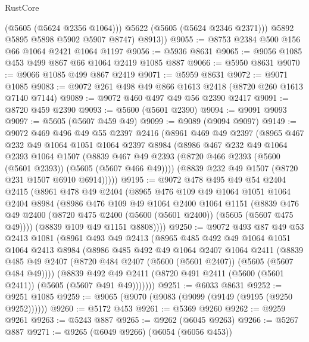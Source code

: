 \begin{lexlean}{RustCore}
\begin{coremodule}
              (@5605 (@5624 @2356 @1064)))
            @5622
            (@5605 (@5624 @2346 @2371)))
          @5892
          @5895
          @5898
          @5902
          @5907
          @8747)
        @8913))
@9055 := @8753 @2384 @500 @156 @66 @1064 @2421 @1064 @1197
@9056 := @5936 @8631
@9065 := @9056 @1085 @453 @499 @867 @66 @1064 @2419 @1085 @887
@9066 := @5950 @8631
@9070 := @9066 @1085 @499 @867 @2419
@9071 := @5959 @8631
@9072 := @9071 @1085
@9083 := @9072 @261 @498 @49 @866 @1613 @2418 (@8720 @260 @1613 @7140 @7144)
@9089 := @9072 @460 @497 @49 @56 @2390 @2417
@9091 := @8720 @459 @2390
@9093 := @5600 (@5601 @2390)
@9094 := @9091 @9093
@9097 := @5605 (@5607 @459 @49)
@9099 := @9089 (@9094 @9097)
@9149 := @9072
    @469
    @496
    @49
    @55
    @2397
    @2416
    (@8961
      @469
      @49
      @2397
      (@8965
        @467
        @232
        @49
        @1064
        @1051
        @1064
        @2397
        @8984
        (@8986
          @467
          @232
          @49
          @1064
          @2393
          @1064
          @1507
          (@8839 @467 @49 @2393 (@8720 @466 @2393 (@5600 (@5601 @2393)) (@5605 (@5607 @466 @49))))
          (@8839 @232 @49 @1507 (@8720 @231 @1507 @6910 @6914)))))
@9195 := @9072
    @478
    @495
    @49
    @54
    @2404
    @2415
    (@8961
      @478
      @49
      @2404
      (@8965
        @476
        @109
        @49
        @1064
        @1051
        @1064
        @2404
        @8984
        (@8986
          @476
          @109
          @49
          @1064
          @2400
          @1064
          @1151
          (@8839 @476 @49 @2400 (@8720 @475 @2400 (@5600 (@5601 @2400)) (@5605 (@5607 @475 @49))))
          (@8839 @109 @49 @1151 @8808))))
@9250 := @9072
    @493
    @87
    @49
    @53
    @2413
    @1081
    (@8961
      @493
      @49
      @2413
      (@8965
        @485
        @492
        @49
        @1064
        @1051
        @1064
        @2413
        @8984
        (@8986
          @485
          @492
          @49
          @1064
          @2407
          @1064
          @2411
          (@8839 @485 @49 @2407 (@8720 @484 @2407 (@5600 (@5601 @2407)) (@5605 (@5607 @484 @49))))
          (@8839
            @492
            @49
            @2411
            (@8720 @491 @2411 (@5600 (@5601 @2411)) (@5605 (@5607 @491 @49)))))))
@9251 := @6033 @8631
@9252 := @9251 @1085
@9259 := @9065 (@9070 (@9083 (@9099 (@9149 (@9195 (@9250 @9252))))))
@9260 := @5172 @453
@9261 := @5369 @9260
@9262 := @9259 @9261
@9263 := @5243 @887
@9265 := @9262 (@6045 @9263)
@9266 := @5267 @887
@9271 := @9265 (@6049 @9266) (@6054 (@6056 @453))

\end{coremodule}
\end{lexlean}

